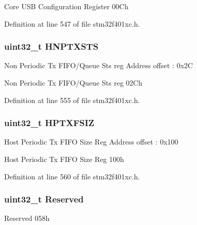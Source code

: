 Core U\+SB Configuration Register 00\+Ch 

Definition at line 547 of file stm32f401xc.\+h.

\subsubsection[{\texorpdfstring{H\+N\+P\+T\+X\+S\+TS}{HNPTXSTS}}]{ uint32\+\_\+t H\+N\+P\+T\+X\+S\+TS}\hypertarget{struct_u_s_b___o_t_g___global_type_def_a6ff3c8a6647ae7e5dfcd2ccfbfed4948}{}\label{struct_u_s_b___o_t_g___global_type_def_a6ff3c8a6647ae7e5dfcd2ccfbfed4948}
Non Periodic Tx F\+I\+F\+O/\+Queue Sts reg Address offset \+: 0x2C

Non Periodic Tx F\+I\+F\+O/\+Queue Sts reg 02\+Ch 

Definition at line 555 of file stm32f401xc.\+h.

\subsubsection[{\texorpdfstring{H\+P\+T\+X\+F\+S\+IZ}{HPTXFSIZ}}]{ uint32\+\_\+t H\+P\+T\+X\+F\+S\+IZ}\hypertarget{struct_u_s_b___o_t_g___global_type_def_a928fd38284165374eb5aa85ed8d4e6cb}{}\label{struct_u_s_b___o_t_g___global_type_def_a928fd38284165374eb5aa85ed8d4e6cb}
Host Periodic Tx F\+I\+FO Size Reg Address offset \+: 0x100

Host Periodic Tx F\+I\+FO Size Reg 100h 

Definition at line 560 of file stm32f401xc.\+h.

\subsubsection[{\texorpdfstring{Reserved}{Reserved}}]{\setlength{\rightskip}{0pt plus 5cm}uint32\+\_\+t Reserved}\hypertarget{struct_u_s_b___o_t_g___global_type_def_a43fae5b728aa075b9475bbe49a5738ef}{}\label{struct_u_s_b___o_t_g___global_type_def_a43fae5b728aa075b9475bbe49a5738ef}
Reserved 058h 

